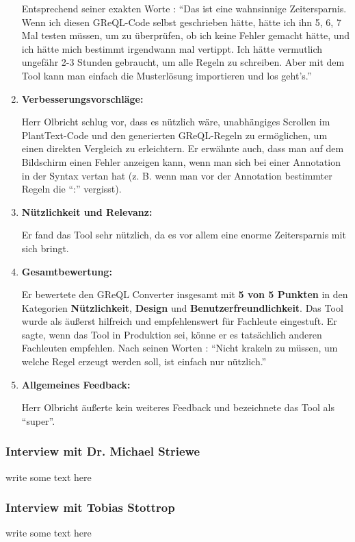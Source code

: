 \begin{enumerate}[itemsep=8pt, parsep=5pt]
    Entsprechend seiner exakten Worte : ``Das ist eine wahnsinnige Zeitersparnis. Wenn ich diesen GReQL-Code selbst
    geschrieben hätte, hätte ich ihn 5, 6, 7 Mal testen müssen, um zu überprüfen, ob ich keine Fehler gemacht hätte,
    und ich hätte mich bestimmt irgendwann mal vertippt. Ich hätte vermutlich ungefähr 2-3 Stunden gebraucht, um alle
    Regeln zu schreiben. Aber mit dem Tool kann man einfach die Musterlösung importieren und los geht's.''

    \item \textbf{Verbesserungsvorschläge:}

    Herr Olbricht schlug vor, dass es nützlich wäre, unabhängiges Scrollen im PlantText-Code und den generierten
    GReQL-Regeln zu ermöglichen, um einen direkten Vergleich zu erleichtern. Er erwähnte auch, dass man auf dem
    Bildschirm einen Fehler anzeigen kann, wenn man sich bei einer Annotation in der Syntax vertan hat
    (z. B. wenn man vor der Annotation bestimmter Regeln die ``:'' vergisst).

    \item \textbf{Nützlichkeit und Relevanz:}

    Er fand das Tool sehr nützlich, da es vor allem eine enorme Zeitersparnis mit sich bringt.
    
    \item \textbf{Gesamtbewertung:}

    Er bewertete den GReQL Converter insgesamt mit \textbf{5 von 5 Punkten} in den Kategorien \textbf{Nützlichkeit},
    \textbf{Design} und \textbf{Benutzerfreundlichkeit}. Das Tool wurde als äußerst hilfreich und empfehlenswert für 
    Fachleute eingestuft. Er sagte, wenn das Tool in Produktion sei, könne er es tatsächlich anderen Fachleuten
    empfehlen. Nach seinen Worten : ``Nicht krakeln zu müssen, um welche Regel erzeugt werden soll, ist einfach nur
    nützlich.''

    \item \textbf{Allgemeines Feedback:}

    Herr Olbricht äußerte kein weiteres Feedback und bezeichnete das Tool als ``super''.
\end{enumerate}

\subsubsection{Interview mit Dr. Michael Striewe}
write some text here

\subsubsection{Interview mit Tobias Stottrop}
write some text here